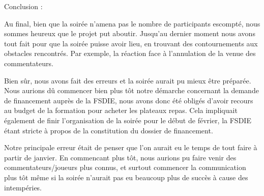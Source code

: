 Conclusion :

Au final, bien que la soirée n'amena pas le nombre de participants escompté, nous sommes heureux que le projet put aboutir. 
Jusqu'au dernier moment nous avons tout fait pour que la soirée puisse avoir lieu, en trouvant des contournements aux 
obstacles rencontrés. Par exemple, la réaction face à l'annulation de la venue des commentateurs.

Bien sûr, nous avons fait des erreurs et la soirée aurait pu mieux être préparée. Nous aurions dû commencer bien plus tôt 
notre démarche concernant la demande de financement auprès de la FSDIE, nous avons donc été obligés d'avoir recours au budget 
de la formation pour acheter les plateaux repas. Cela impliquait également de finir l'organisation de la soirée pour le début 
de février, la FSDIE étant stricte à propos de la constitution du dossier de financement.

Notre principale erreur était de penser que l'on aurait eu le temps de tout faire à partir de janvier. En commencant plus tôt,
nous aurions pu faire venir des commentateurs/joueurs plus connus, et surtout commencer la communication plus tôt même si la soirée 
n'aurait pas eu beaucoup plus de succès à cause des intempéries.